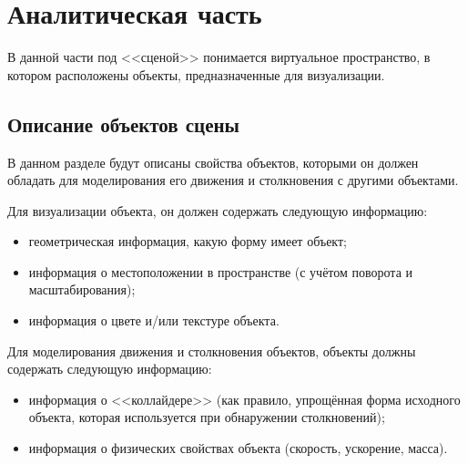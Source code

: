 \section{Аналитическая часть}





В данной части под <<сценой>> понимается виртуальное пространство, в котором расположены объекты, предназначенные для визуализации.

\subsection{Описание объектов сцены}

В данном разделе будут описаны свойства объектов, которыми он должен обладать для моделирования его движения и столкновения с другими объектами.

Для визуализации объекта, он должен содержать следующую информацию:
\begin{itemize}
    \item геометрическая информация, какую форму имеет объект;
    \item информация о местоположении в пространстве (с учётом поворота и масштабирования);
    \item информация о цвете и/или текстуре объекта.
\end{itemize}

Для моделирования движения и столкновения объектов, объекты должны содержать следующую информацию:
\begin{itemize}
    \item информация о <<коллайдере>> (как правило, упрощённая форма исходного объекта, которая используется при обнаружении столкновений);
    \item информация о физических свойствах объекта (скорость, ускорение, масса).
\end{itemize}


